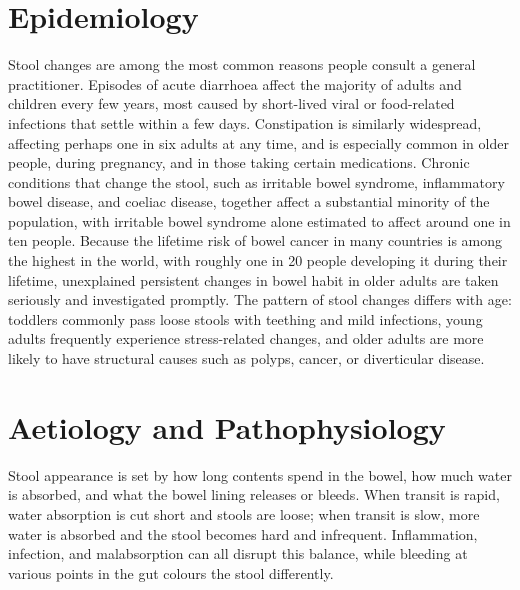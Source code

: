 \section*{Epidemiology}
Stool changes are among the most common reasons people consult a general practitioner. Episodes of acute diarrhoea affect the majority of adults and children every few years, most caused by short-lived viral or food-related infections that settle within a few days. Constipation is similarly widespread, affecting perhaps one in six adults at any time, and is especially common in older people, during pregnancy, and in those taking certain medications. Chronic conditions that change the stool, such as irritable bowel syndrome, inflammatory bowel disease, and coeliac disease, together affect a substantial minority of the population, with irritable bowel syndrome alone estimated to affect around one in ten people. Because the lifetime risk of bowel cancer in many countries is among the highest in the world, with roughly one in 20 people developing it during their lifetime, unexplained persistent changes in bowel habit in older adults are taken seriously and investigated promptly. The pattern of stool changes differs with age: toddlers commonly pass loose stools with teething and mild infections, young adults frequently experience stress-related changes, and older adults are more likely to have structural causes such as polyps, cancer, or diverticular disease.

\section*{Aetiology and Pathophysiology}
Stool appearance is set by how long contents spend in the bowel, how much water is absorbed, and what the bowel lining releases or bleeds. When transit is rapid, water absorption is cut short and stools are loose; when transit is slow, more water is absorbed and the stool becomes hard and infrequent. Inflammation, infection, and malabsorption can all disrupt this balance, while bleeding at various points in the gut colours the stool differently.

